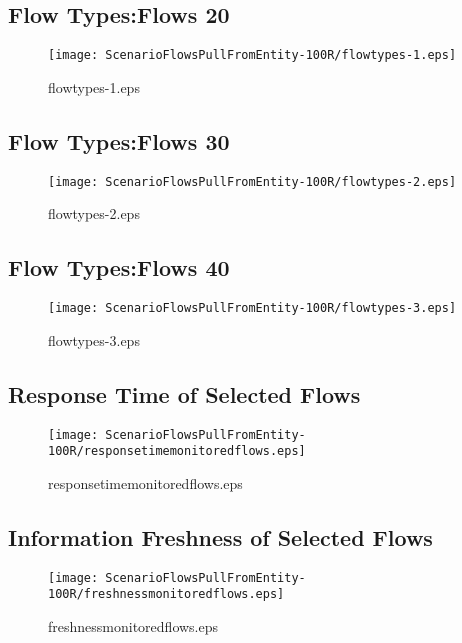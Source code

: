 \documentclass{elsart}
\begin{document}
\clearpage
\subsection{Flow Types:Flows 20}

\begin{figure}[ht]
\centering
\texttt{[image: ScenarioFlowsPullFromEntity-100R/flowtypes-1.eps]}
\caption{flowtypes-1.eps}\label{fig:flowtypes-1}
\end{figure}

\clearpage
\subsection{Flow Types:Flows 30}

\begin{figure}[ht]
\centering
\texttt{[image: ScenarioFlowsPullFromEntity-100R/flowtypes-2.eps]}
\caption{flowtypes-2.eps}\label{fig:flowtypes-2}
\end{figure}

\clearpage
\subsection{Flow Types:Flows 40}

\begin{figure}[ht]
\centering
\texttt{[image: ScenarioFlowsPullFromEntity-100R/flowtypes-3.eps]}
\caption{flowtypes-3.eps}\label{fig:flowtypes-3}
\end{figure}

\clearpage
\subsection{Response Time of Selected Flows}

\begin{figure}[ht]
\centering
\texttt{[image: ScenarioFlowsPullFromEntity-100R/responsetimemonitoredflows.eps]}
\caption{responsetimemonitoredflows.eps}\label{fig:responsetimemonitoredflows}
\end{figure}

\clearpage
\subsection{Information Freshness of Selected Flows}

\begin{figure}[ht]
\centering
\texttt{[image: ScenarioFlowsPullFromEntity-100R/freshnessmonitoredflows.eps]}
\caption{freshnessmonitoredflows.eps}\label{fig:freshnessmonitoredflows}
\end{figure}

\clearpage
\end{document}
